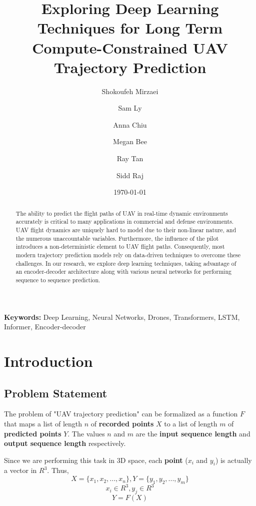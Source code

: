 \documentclass{article}
\begin{document}
\title{
    Exploring Deep Learning Techniques for Long Term Compute-Constrained UAV Trajectory Prediction
}

\author{
    Shokoufeh Mirzaei
    \and Sam Ly
    \and Anna Chiu
    \and Megan Bee
    \and Ray Tan
    \and Sidd Raj
}

\date{\today}

\maketitle

\begin{abstract}
    The ability to predict the flight paths of UAV in real-time dynamic 
    environments accurately is critical to many applications in commercial and 
    defense environments. UAV flight dynamics are uniquely hard to model due to 
    their non-linear nature, and the numerous unaccountable variables. 
    Furthermore, the influence of the pilot introduces a non-deterministic 
    element to UAV flight paths. Consequently, most  modern trajectory 
    prediction models rely on data-driven techniques to overcome these 
    challenges. In our research, we explore deep learning techniques, taking 
    advantage of an encoder-decoder architecture along with various neural 
    networks for performing sequence to sequence prediction. 
\end{abstract}

\noindent\textbf{Keywords:} Deep Learning, Neural Networks, Drones, Transformers, LSTM, Informer, Encoder-decoder

\section{Introduction}
\subsection{Problem Statement}
The problem of "UAV trajectory prediction" can be formalized as a function $F$ 
that maps a list of length $n$ of \textbf{recorded points} $X$ to a list of 
length $m$ of \textbf{predicted points} $Y$. The values $n$ and $m$ are the 
\textbf{input sequence length} and \textbf{output sequence length} respectively.

Since we are performing this task in 3D space, each \textbf{point} ($x_i$ and 
$y_i$) is actually a vector in $R^3$. Thus,
$$ X = \{x_1, x_2, ..., x_n\}, Y = \{y_1, y_2, ..., y_m\} $$ 
$$ x_i \in R^3, y_j \in R^3 $$
$$ Y = F(X) $$
\end{document}
